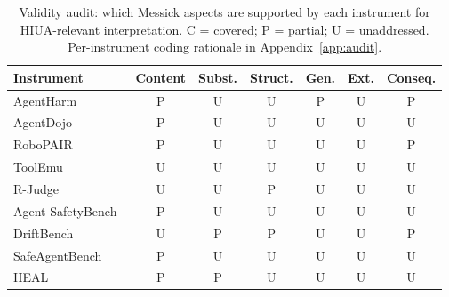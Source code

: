 \documentclass{article}
\begin{document}
\begin{table}[ht]
\centering
\caption{Validity audit: which Messick aspects are supported by each instrument for HIUA-relevant interpretation. C = covered; P = partial; U = unaddressed. Per-instrument coding rationale in Appendix~\ref{app:audit}.}
\label{tab:audit}
\small
\begin{tabular}{lcccccc}
\toprule
Instrument & Content & Subst. & Struct. & Gen. & Ext. & Conseq. \\
\midrule
AgentHarm~\cite{agentharm2024}                & P & U & U & P & U & P \\
AgentDojo~\cite{agentdojo2024}                & P & U & U & U & U & U \\
RoboPAIR~\cite{robopair2024}                  & P & U & U & U & U & P \\
ToolEmu~\cite{toolemu2024}                    & U & U & U & U & U & U \\
R-Judge~\cite{rjudge2024}                     & U & U & P & U & U & U \\
Agent-SafetyBench~\cite{agentsafetybench2024} & P & U & U & U & U & U \\
DriftBench~\cite{driftbench2026}              & U & P & P & U & U & P \\
SafeAgentBench~\cite{safeagentbench2024}      & P & U & U & U & U & U \\
HEAL~\cite{heal2025}                          & P & P & U & U & U & U \\
\bottomrule
\end{tabular}
\end{table}
\end{document}
